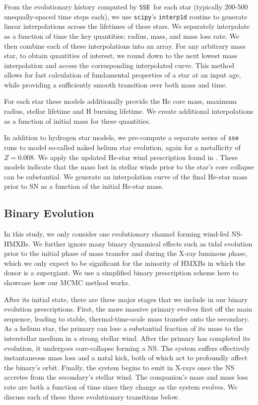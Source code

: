 \documentclass[usenatbib]{mnras}
\newcommand{\sse}{{\tt SSE}}
\begin{document}
From the evolutionary history computed by \sse\ for each star (typically 200-500 unequally-spaced time steps each), we use {\tt scipy}'s {\tt interp1d} routine to generate linear interpolations across the lifetimes of these stars. We separately interpolate as a function of time the key quantities: radius, mass, and mass loss rate. We then combine each of these interpolations into an array. For any arbitrary mass star, to obtain quantities of interest, we round down to the next lowest mass interpolation and access the corresponding interpolated curve. This method allows for fast calculation of fundamental properties of a star at an input age, while providing a sufficiently smooth transition over both mass and time.

For each star these models additionally provide the He core mass, maximum radius, stellar lifetime and H burning lifetime. We create additional interpolations as a function of initial mass for these quantities.

In addition to hydrogen star models, we pre-compute a separate series of {\tt sse} runs to model so-called naked helium star evolution, again for a metallicity of $Z=0.008$. We apply the updated He-star wind prescription found in \citep{belczynski10}. These models indicate that the mass lost in stellar winds prior to the star's core collapse can be substantial. We generate an interpolation curve of the final He-star mass prior to SN as a function of the initial He-star mass.


\subsection{Binary Evolution} \label{sec:binary_evolve}

In this study, we only consider one evolutionary channel forming wind-fed NS-HMXBs. We further ignore many binary dynamical effects such as tidal evolution prior to the initial phase of mass transfer and during the X-ray luminous phase, which we only expect to be significant for the minority of HMXBs in which the donor is a supergiant. We use a simplified binary prescription scheme here to showcase how our MCMC method works.

After its initial state, there are three major stages that we include in our binary evolution prescriptions. First, the more massive primary evolves first off the main sequence, leading to stable, thermal-time-scale mass transfer onto the secondary. As a helium star, the primary can lose a substantial fraction of its mass to the interstellar medium in a strong stellar wind. After the primary has completed its evolution, it undergoes core-collapse forming a NS. The system suffers effectively instantaneous mass loss and a natal kick, both of which act to profoundly affect the binary's orbit. Finally, the system begins to emit in X-rays once the NS accretes from the secondary's stellar wind. The companion's mass and mass loss rate are both a function of time since they change as the system evolves. We discuss each of these three evolutionary transitions below.
\end{document}
